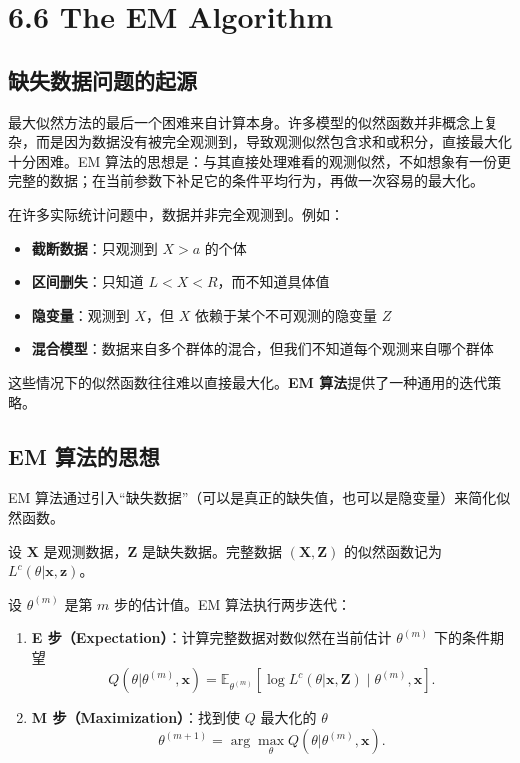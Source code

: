 \section{6.6 The EM Algorithm}\label{sec:6.6}

\subsection{缺失数据问题的起源}

最大似然方法的最后一个困难来自计算本身。许多模型的似然函数并非概念上复杂，而是因为数据没有被完全观测到，导致观测似然包含求和或积分，直接最大化十分困难。EM 算法的思想是：与其直接处理难看的观测似然，不如想象有一份更完整的数据；在当前参数下补足它的条件平均行为，再做一次容易的最大化。

在许多实际统计问题中，数据并非完全观测到。例如：

\begin{itemize}
\item \textbf{截断数据}：只观测到 $X > a$ 的个体
\item \textbf{区间删失}：只知道 $L < X < R$，而不知道具体值
\item \textbf{隐变量}：观测到 $X$，但 $X$ 依赖于某个不可观测的隐变量 $Z$
\item \textbf{混合模型}：数据来自多个群体的混合，但我们不知道每个观测来自哪个群体
\end{itemize}

这些情况下的似然函数往往难以直接最大化。\textbf{EM 算法}提供了一种通用的迭代策略。

\subsection{EM 算法的思想}

EM 算法通过引入``缺失数据''（可以是真正的缺失值，也可以是隐变量）来简化似然函数。

设 $\mathbf{X}$ 是观测数据，$\mathbf{Z}$ 是缺失数据。完整数据 $(\mathbf{X}, \mathbf{Z})$ 的似然函数记为 $L^c(\theta|\mathbf{x}, \mathbf{z})$。

设 $\theta^{(m)}$ 是第 $m$ 步的估计值。EM 算法执行两步迭代：

\begin{enumerate}
\item \textbf{E 步（Expectation）}：计算完整数据对数似然在当前估计 $\theta^{(m)}$ 下的条件期望
\[
Q(\theta|\theta^{(m)}, \mathbf{x}) = \mathbb{E}_{\theta^{(m)}}\left[ \log L^c(\theta|\mathbf{x}, \mathbf{Z}) \mid \theta^{(m)}, \mathbf{x} \right].
\label{eq:em-e-step}
\]

\item \textbf{M 步（Maximization）}：找到使 $Q$ 最大化的 $\theta$
\[
\theta^{(m+1)} = \arg\max_{\theta} Q(\theta|\theta^{(m)}, \mathbf{x}).
\label{eq:em-m-step}
\]
\end{enumerate}

